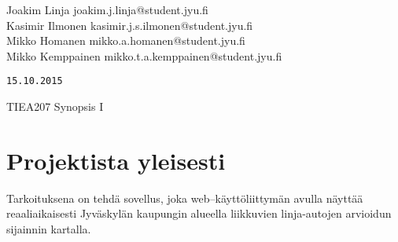 \documentclass[a4paper, twoside, finnish, english, 12pt]{article}
\title{}
\author{Joakim Linja}
\begin{document}
\setlength{\parindent}{0pt} %
\setlength{\parskip}{4mm} %
\onehalfspacing
\newcommand{\pound}{\operatornamewithlimits{\#}}
\newcommand{\lA}{\left\langle}
\newcommand{\rA}{\right\rangle}
\newcommand{\lI}{\left|}
\newcommand{\rI}{\right|}
\newcommand{\Unit}[1]{\ \unit{#1}}
\newcommand{\Var}[2]{$#1\ \unit{#2}$}
\newcommand{\Varf}[3]{$#1\ \frac{\unit{#2}}{\unit{#3}}$}
\newcommand{\Eqen}{\text{.}}
\newcommand{\todoi}[1]{\todo[inline]{#1}}
\newcommand{\cluster}[2]{$\text{#1}_{#2}$}
\newcommand{\vuosi}{2014}
\newcommand{\question}[1]{\subsection*{Question {#1} solution}}
\newcommand{\labwork}[1]{\newpage \section{#1}}
\newcommand{\E}[1]{\cdot 10^{#1}}
\newcommand{\Et}[1]{\ \text{x}10^{#1}}
\newcommand{\EUnit}[2]{\E{#1}\Unit{#2}}
\newcommand{\FUnit}[2]{\ \frac{\unit{#1}}{\unit{#2}}}
\newcommand{\EFUnit}[3]{\E{#1}\frac{\unit{#2}}{\unit{#3}}}
\newcommand{\upd}{\text{d}}


\begin{flushleft}
Joakim Linja
\hfill 
\textsf{joakim.j.linja@student.jyu.fi}\hfill
\\ Kasimir Ilmonen\hfill
\textsf{kasimir.j.s.ilmonen@student.jyu.fi}\hfill
\\ Mikko Homanen\hfill
\textsf{mikko.a.homanen@student.jyu.fi}\hfill
\\ Mikko Kemppainen\hfill
\textsf{mikko.t.a.kemppainen@student.jyu.fi}\hfill

\hfill \texttt{15.10.2015}
\end{flushleft}
\setcounter{page}{1}

\begin{center}
\huge
{TIEA207 Synopsis I}
\end{center}

\section{Projektista yleisesti}
Tarkoituksena on tehdä sovellus, joka web--käyttöliittymän avulla näyttää reaaliaikaisesti Jyväskylän kaupungin alueella liikkuvien linja-autojen arvioidun sijainnin kartalla. 
\end{document}
